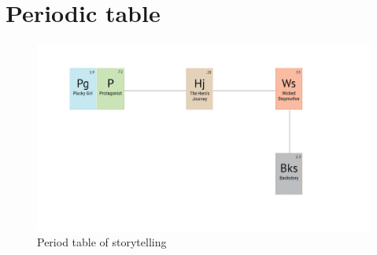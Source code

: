 \section{Periodic table}
\begin{figure}[H]
  \centering
  \includegraphics[width=18cm]{Images/SVG/Exported/periodicTable}
  \caption{Period table of storytelling}
\end{figure}
